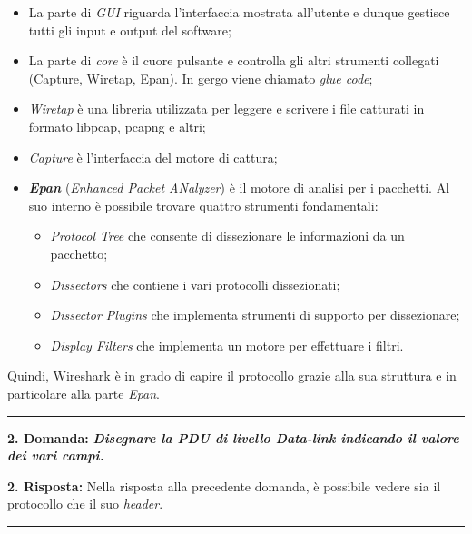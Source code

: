 \documentclass[a4paper]{article}
\newcommand{\longline}{\noindent\rule{\textwidth}{0.4pt}}
\begin{document}
	\noindent
	\begin{itemize}
		\item La parte di \emph{GUI} riguarda l'interfaccia mostrata all'utente e dunque gestisce tutti gli input e output del software;
		
		\item La parte di \emph{core} è il cuore pulsante e controlla gli altri strumenti collegati (Capture, Wiretap, Epan). In gergo viene chiamato \emph{glue code};
		
		\item \emph{Wiretap} è una libreria utilizzata per leggere e scrivere i file catturati in formato libpcap, pcapng e altri;

		\item \emph{Capture} è l'interfaccia del motore di cattura;
		
		\item \textbf{\emph{Epan}} (\emph{Enhanced Packet ANalyzer}) è il motore di analisi per i pacchetti. Al suo interno è possibile trovare quattro strumenti fondamentali:
		\begin{itemize}
			\item \emph{Protocol Tree} che consente di dissezionare le informazioni da un pacchetto;
			
			\item \emph{Dissectors} che contiene i vari protocolli dissezionati;
			
			\item \emph{Dissector Plugins} che implementa strumenti di supporto per dissezionare;
			
			\item \emph{Display Filters} che implementa un motore per effettuare i filtri.
		\end{itemize}
	\end{itemize}
	Quindi, Wireshark è in grado di capire il protocollo grazie alla sua struttura e in particolare alla parte \emph{Epan}.
	
	\longline\newline
	
	\noindent
	\textcolor{Red3}{\textbf{2. Domanda:}} \textbf{\emph{Disegnare la PDU di livello Data-link indicando il valore dei vari campi.}}\newline
	
	\noindent
	\textcolor{Green4}{\textbf{2. Risposta:}} Nella risposta alla precedente domanda, è possibile vedere sia il protocollo che il suo \emph{header}.
	
	\longline\newline
	
\end{document}
